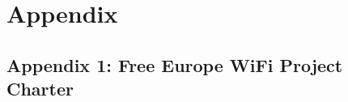 \documentclass[draftclsnofoot,12pt,journal,onecolumn]{IEEEtran}
\begin{document}







\section{Appendix}

\subsection{Appendix 1: Free Europe WiFi Project Charter}

\end{document}
